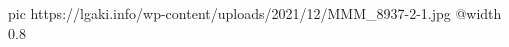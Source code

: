  
 
 
 
 

\ifcmt
  pic https://lgaki.info/wp-content/uploads/2021/12/MMM_8937-2-1.jpg
  @width 0.8
\fi
